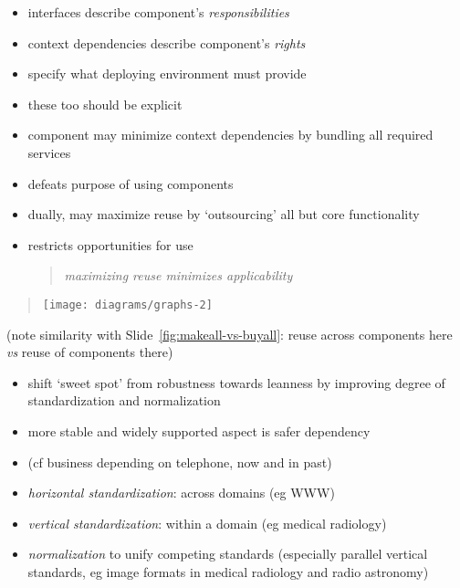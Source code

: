 \documentclass{sepslide-soa-faked} %
\begin{document}
\begin{slide}
\begin{itemize}
\item interfaces describe component's \emph{responsibilities}
\item context dependencies describe component's \emph{rights}
\item specify what deploying environment must provide
\item these too should be explicit
\end{itemize}
\end{slide}

\begin{slide}
\begin{itemize}
\item component may minimize context dependencies by bundling all required
services
\item defeats purpose of using components
\item dually, may maximize reuse by `outsourcing' all but core
functionality
\item restricts opportunities for use
\begin{quote}
  \emph{maximizing reuse minimizes applicability}
\end{quote}
\end{itemize}
\end{slide}

\begin{slide}
\begin{quote} 
\texttt{[image: diagrams/graphs-2]} 
\end{quote}
(note similarity with Slide~\ref{fig:makeall-vs-buyall}: 
reuse across components here \textit{vs} reuse of components there)
\end{slide}

\begin{slide}
\begin{itemize}
\item shift `sweet spot' from robustness towards leanness by improving
degree of standardization and normalization
\item more stable and widely supported aspect is safer dependency
\item (cf business depending on telephone, now and in past)
\item \emph{horizontal standardization}: across domains (eg WWW)
\item \emph{vertical standardization}: within a domain (eg medical radiology)
\item \emph{normalization} to unify competing standards
  (especially parallel vertical standards, eg image formats in medical
  radiology and radio astronomy)
\end{itemize}
\end{slide}
\end{document}
